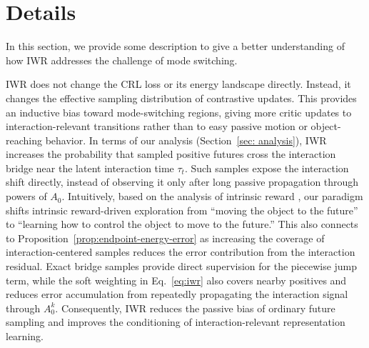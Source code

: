\section{\methodname{} Details}
\label{app:iwr_details}
In this section, we provide some description to give a better understanding of how IWR addresses the challenge of mode switching. 


IWR does not change the CRL loss or its energy landscape directly. Instead, it changes the effective sampling distribution of contrastive updates. This provides an inductive bias toward mode-switching regions, giving more critic updates to interaction-relevant transitions rather than to easy passive motion or object-reaching behavior. In terms of our analysis (Section~\ref{sec: analysis}), IWR increases the probability that sampled positive futures cross the interaction bridge near the latent interaction time \(\tau_t\). Such samples expose the interaction shift directly, instead of observing it only after long passive propagation through powers of \(A_0\). Intuitively, based on the analysis of intrinsic reward \cite{bastankhah2026demystifying}, our paradigm shifts intrinsic reward-driven exploration from ``moving the object to the future'' to ``learning how to control the object to move to the future.'' This also connects to Proposition~\ref{prop:endpoint-energy-error} as increasing the coverage of interaction-centered samples reduces the error contribution from the interaction residual. Exact bridge samples provide direct supervision for the piecewise jump term, while the soft weighting in Eq.~\ref{eq:iwr} also covers nearby positives and reduces error accumulation from repeatedly propagating the interaction signal through \(A_0^k\).
Consequently, IWR reduces the passive bias of ordinary future sampling and improves the conditioning of interaction-relevant representation learning.


